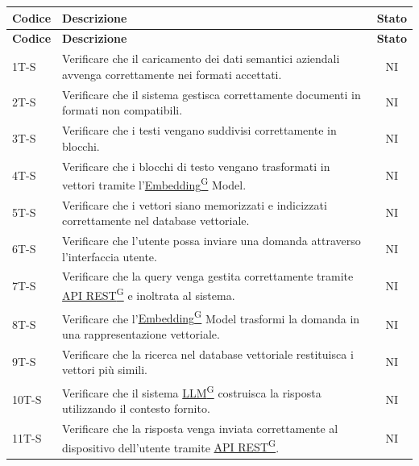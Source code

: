 \documentclass{article}
\begin{document}
\begin{longtable}{|>{\centering\arraybackslash}m{}|>{\raggedright\arraybackslash}m{}|c|}
    \hline
    \textbf{Codice} & \textbf{Descrizione} & \textbf{Stato} \\
    \hline
    \endfirsthead
    \hline
    \textbf{Codice} & \textbf{Descrizione} & \textbf{Stato} \\
    \hline
    \endhead
    \hline
    \endfoot
    \hline
    1T-S & Verificare che il caricamento dei dati semantici aziendali avvenga correttamente nei formati accettati. & NI \\
    \hline
    2T-S & Verificare che il sistema gestisca correttamente documenti in formati non compatibili. & NI \\
    \hline
    3T-S & Verificare che i testi vengano suddivisi correttamente in blocchi. & NI \\
    \hline
    4T-S & Verificare che i blocchi di testo vengano trasformati in vettori tramite l’\href{https://code7crusaders.github.io/docs/RTB/documentazione_interna/glossario.html#embedding}{Embedding\textsuperscript{G}} Model. & NI \\
    \hline
    5T-S & Verificare che i vettori siano memorizzati e indicizzati correttamente nel database vettoriale. & NI \\
    \hline
    6T-S & Verificare che l’utente possa inviare una domanda attraverso l’interfaccia utente. & NI \\
    \hline
    7T-S & Verificare che la query venga gestita correttamente tramite \href{https://code7crusaders.github.io/docs/RTB/documentazione_interna/glossario.html#api-rest-representational-state-transfer}{API REST\textsuperscript{G}} e inoltrata al sistema. & NI \\
    \hline
    8T-S & Verificare che l’\href{https://code7crusaders.github.io/docs/RTB/documentazione_interna/glossario.html#embedding}{Embedding\textsuperscript{G}} Model trasformi la domanda in una rappresentazione vettoriale. & NI \\
    \hline
    9T-S & Verificare che la ricerca nel database vettoriale restituisca i vettori più simili. & NI \\
    \hline
    10T-S & Verificare che il sistema \href{https://code7crusaders.github.io/docs/RTB/documentazione_interna/glossario.html#llm-large-language-model}{LLM\textsuperscript{G}} costruisca la risposta utilizzando il contesto fornito. & NI \\
    \hline
    11T-S & Verificare che la risposta venga inviata correttamente al dispositivo dell’utente tramite \href{https://code7crusaders.github.io/docs/RTB/documentazione_interna/glossario.html#api-rest-representational-state-transfer}{API REST\textsuperscript{G}}. & NI \\

\end{longtable}
\end{document}
